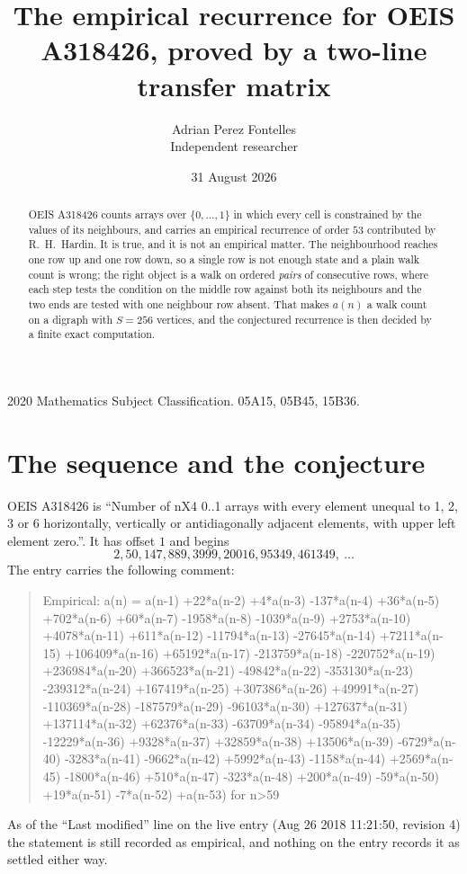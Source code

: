 \documentclass[11pt,a4paper]{article}
\title{The empirical recurrence for OEIS A318426, proved by a two-line transfer matrix}
\author{Adrian Perez Fontelles\\ \small Independent researcher}
\date{31 August 2026}
\theoremstyle{plain}
\theoremstyle{definition}
\begin{document}
\maketitle

\begin{abstract}
OEIS A318426 counts arrays over $\{0,\dots,1\}$ in which every cell is constrained by the
values of its neighbours, and carries an empirical recurrence of order $53$ contributed
by R.~H.~Hardin. It is true, and it is not an empirical matter. The neighbourhood reaches one
row up and one row down, so a single row is not enough state and a plain walk count
is wrong; the right object is a walk on ordered \emph{pairs} of consecutive rows, where
each step tests the condition on the middle row against both its neighbours and the two
ends are tested with one neighbour row absent. That makes $a(n)$ a walk count on a digraph
with $S=256$ vertices, and the conjectured recurrence is then decided by a finite exact
computation.
\end{abstract}

\noindent\small 2020 Mathematics Subject Classification. 05A15, 05B45, 15B36.\normalsize

\section{The sequence and the conjecture}

OEIS A318426 is ``Number of nX4 0..1 arrays with every element unequal to 1, 2, 3 or 6 horizontally, vertically or antidiagonally adjacent elements, with upper left element zero.''. It has offset $1$ and begins
\[
2, 50, 147, 889, 3999, 20016, 95349, 461349,\ \dots
\]
The entry carries the following comment:
\begin{quote}\small
Empirical: a(n) = a(n-1) +22*a(n-2) +4*a(n-3) -137*a(n-4) +36*a(n-5) +702*a(n-6) +60*a(n-7) -1958*a(n-8) -1039*a(n-9) +2753*a(n-10) +4078*a(n-11) +611*a(n-12) -11794*a(n-13) -27645*a(n-14) +7211*a(n-15) +106409*a(n-16) +65192*a(n-17) -213759*a(n-18) -220752*a(n-19) +236984*a(n-20) +366523*a(n-21) -49842*a(n-22) -353130*a(n-23) -239312*a(n-24) +167419*a(n-25) +307386*a(n-26) +49991*a(n-27) -110369*a(n-28) -187579*a(n-29) -96103*a(n-30) +127637*a(n-31) +137114*a(n-32) +62376*a(n-33) -63709*a(n-34) -95894*a(n-35) -12229*a(n-36) +9328*a(n-37) +32859*a(n-38) +13506*a(n-39) -6729*a(n-40) -3283*a(n-41) -9662*a(n-42) +5992*a(n-43) -1158*a(n-44) +2569*a(n-45) -1800*a(n-46) +510*a(n-47) -323*a(n-48) +200*a(n-49) -59*a(n-50) +19*a(n-51) -7*a(n-52) +a(n-53) for n>59
\end{quote}
As of the ``Last modified'' line on the live entry (Aug 26 2018 11:21:50, revision 4) the statement is
still recorded as empirical, and nothing on the entry records it as settled either way.
\end{document}
